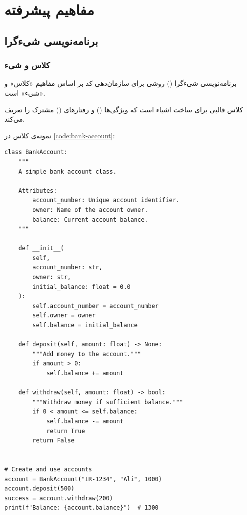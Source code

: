 \documentclass{matinbook}
\begin{document}
\part{مفاهیم پیشرفته}

\chapter{برنامه‌نویسی شیءگرا}
\label{chap:oop}

\section{کلاس و شیء}
\label{sec:oop-classes}

برنامه‌نویسی شیءگرا
() روشی برای سازمان‌دهی کد بر اساس مفاهیم
«کلاس» و «شیء» است.

\begin{definition}[کلاس]
    کلاس قالبی برای ساخت اشیاء
    است که ویژگی‌ها () و رفتارهای
    () مشترک را تعریف می‌کند.
    \label{def:class}
\end{definition}

نمونه‌ی کلاس در \cref{code:bank-account}:

\begin{latin}
\begin{verbatim}
class BankAccount:
    """
    A simple bank account class.

    Attributes:
        account_number: Unique account identifier.
        owner: Name of the account owner.
        balance: Current account balance.
    """

    def __init__(
        self,
        account_number: str,
        owner: str,
        initial_balance: float = 0.0
    ):
        self.account_number = account_number
        self.owner = owner
        self.balance = initial_balance

    def deposit(self, amount: float) -> None:
        """Add money to the account."""
        if amount > 0:
            self.balance += amount

    def withdraw(self, amount: float) -> bool:
        """Withdraw money if sufficient balance."""
        if 0 < amount <= self.balance:
            self.balance -= amount
            return True
        return False


# Create and use accounts
account = BankAccount("IR-1234", "Ali", 1000)
account.deposit(500)
success = account.withdraw(200)
print(f"Balance: {account.balance}")  # 1300
\end{verbatim}
\end{latin}
\label{code:bank-account}
\end{document}
